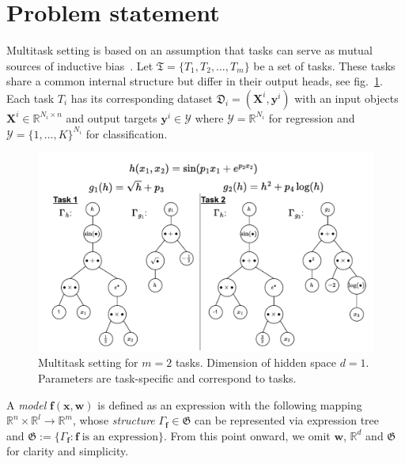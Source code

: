 \documentclass[14pt]{extarticle}
\begin{document}
\section{Problem statement}
    Multitask setting is based on an assumption that tasks can serve as mutual sources of inductive bias~\citep{multitask_ind_bias}. Let \( \mathfrak{T} = \{T_1, T_2, \dots, T_m\} \) be a set of tasks. These tasks share a common internal structure but differ in their output heads, see fig.~\ref{expression_tree}. Each task \( T_i \) has its corresponding dataset \( \mathfrak{D}_i = (\mathbf{X}^i, \mathbf{y}^i) \) with an input objects \(\mathbf{X}^i \in \mathbb{R}^{N_i \times n}\) and output targets \(\mathbf{y}^i \in \mathcal{Y}\) where \(\mathcal{Y}=\mathbb{R}^{N_i}\) for regression and \(\mathcal{Y} = \{1, \dots, K\}^{N_i}\) for classification. 

    \begin{figure}[hbt!]
    \centering
    \includegraphics[width=1\textwidth]{expression_tree.drawio.pdf}
    \caption{Multitask setting for \(m=2\) tasks. Dimension of hidden space \(d=1\). Parameters are task-specific and correspond to tasks.}
    \label{expression_tree}
    \end{figure}

    A \textit{model} \(\mathbf{f}(\mathbf{x}, \mathbf{w})\) is defined as an expression with the following mapping \(\mathbb{R}^n \times \mathbb{R}^l \rightarrow \mathbb{R}^m\), whose \textit{structure} \(\Gamma_\mathbf{f} \in \mathfrak{G}\) can be represented via expression tree~\citep{RudStr13, KULUNCHAKOV2017221} and \(\mathfrak{G} := \{\Gamma_{\mathbf{f}}: \mathbf{f} \; \text{is an expression}\}\). From this point onward, we omit \(\mathbf{w}\), \(\mathbb{R}^d\) and \(\mathfrak{G}\) for clarity and simplicity.
\end{document}
